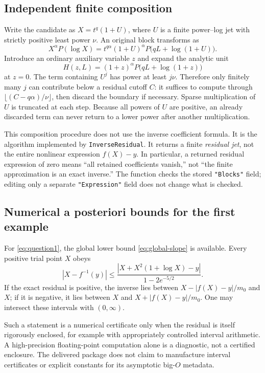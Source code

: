 \documentclass[11pt,a4paper]{article}
\numberwithin{equation}{section}
\theoremstyle{definition}
\newcommand{\code}[1]{\texttt{#1}}
\begin{document}
\subsection{Independent finite composition}
Write the candidate as $X=t^q(1+U)$, where $U$ is a finite power--log jet
with strictly positive least power $\nu$. An original block transforms as
\begin{equation}\label{eq:compose-block}
 X^\alpha P(\log X)
 =t^{q\alpha}(1+U)^\alpha
       P\bigl(qL+\log(1+U)\bigr).
\end{equation}
Introduce an ordinary auxiliary variable $z$ and expand the analytic unit
\[
 H(z,L)=(1+z)^\alpha P\bigl(qL+\log(1+z)\bigr)
\]
at $z=0$. The term containing $U^j$ has power at least $j\nu$.
Therefore only finitely many $j$ can contribute below a residual cutoff
$C$: it suffices to compute through
$\lfloor(C-q\alpha)/\nu\rfloor$, then discard the boundary if necessary.
Sparse multiplication of $U$ is truncated at each step. Because all
powers of $U$ are positive, an already discarded term can never return
to a lower power after another multiplication.

This composition procedure does not use the inverse coefficient formula.
It is the algorithm implemented by \code{InverseResidual}. It returns
a finite \emph{residual jet}, not the entire nonlinear expression
$f(X)-y$. In particular, a returned residual expression of zero means
``all retained coefficients vanish,'' not ``the finite approximation is
an exact inverse.'' The function checks the stored \code{"Blocks"}
field; editing only a separate \code{"Expression"} field does not change
what is checked.

\subsection{Numerical a posteriori bounds for the first example}
For \eqref{eq:question1}, the global lower bound
\eqref{eq:global-slope} is available. Every positive trial point $X$ obeys
\begin{equation}\label{eq:global-numeric-bound}
 |X-f^{-1}(y)|\le
 \frac{|X+X^2(1+\log X)-y|}{1-2e^{-5/2}}.
\end{equation}
If the exact residual is positive, the inverse lies between
$X-|f(X)-y|/m_0$ and $X$; if it is negative, it lies between $X$ and
$X+|f(X)-y|/m_0$. One may intersect these intervals with $(0,\infty)$.

Such a statement is a numerical certificate only when the residual is
itself rigorously enclosed, for example with appropriately controlled
interval arithmetic. A high-precision floating-point computation alone
is a diagnostic, not a certified enclosure. The delivered package does
not claim to manufacture interval certificates or explicit constants for
its asymptotic big-$O$ metadata.
\end{document}

